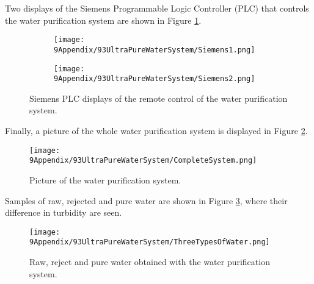 Two displays of the Siemens Programmable Logic Controller (PLC) that controls the water purification system are shown in Figure \ref{fig:Siemens}.
\begin{figure}
\centering
    \begin{subfigure}[b]{0.75\textwidth}
    \centering
    \texttt{[image: 9Appendix/93UltraPureWaterSystem/Siemens1.png]}  
    \caption{}
    \end{subfigure}
    \hfill
    \begin{subfigure}[b]{0.75\textwidth}
    \centering
    \texttt{[image: 9Appendix/93UltraPureWaterSystem/Siemens2.png]}  
    \caption{}
    \end{subfigure}
 \caption{Siemens PLC displays of the remote control of the water purification system.}
 \label{fig:Siemens}
\end{figure}
Finally, a picture of the whole water purification system is displayed in Figure \ref{fig:CompleteSystem}.
\begin{figure}[htbp]
\centering
\texttt{[image: 9Appendix/93UltraPureWaterSystem/CompleteSystem.png]}
\caption{Picture of the water purification system.\label{fig:CompleteSystem}}
\end{figure}
Samples of raw, rejected and pure water are shown in Figure \ref{fig:ThreeTypesOfWater}, where their difference in turbidity are seen.
\begin{figure}[htbp]
\centering
\texttt{[image: 9Appendix/93UltraPureWaterSystem/ThreeTypesOfWater.png]}
\caption{Raw, reject and pure water obtained with the water purification system.\label{fig:ThreeTypesOfWater}}
\end{figure}